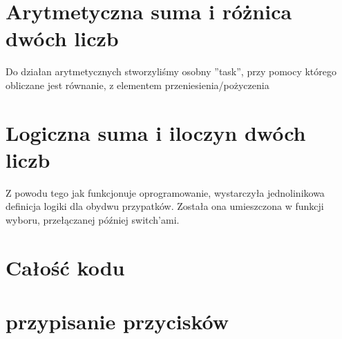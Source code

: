 \section{Arytmetyczna suma i różnica dwóch liczb}
Do działan arytmetycznych stworzyliśmy osobny ''task'', przy pomocy którego obliczane jest równanie, z elementem przeniesienia/pożyczenia



\section{Logiczna suma i iloczyn dwóch liczb}
Z powodu tego jak funkcjonuje oprogramowanie, wystarczyła jednolinikowa definicja logiki dla obydwu przypatków. Została ona umieszczona w funkcji wyboru, przełączanej później switch'ami.



\section{Całość kodu}



\section{przypisanie przycisków}

